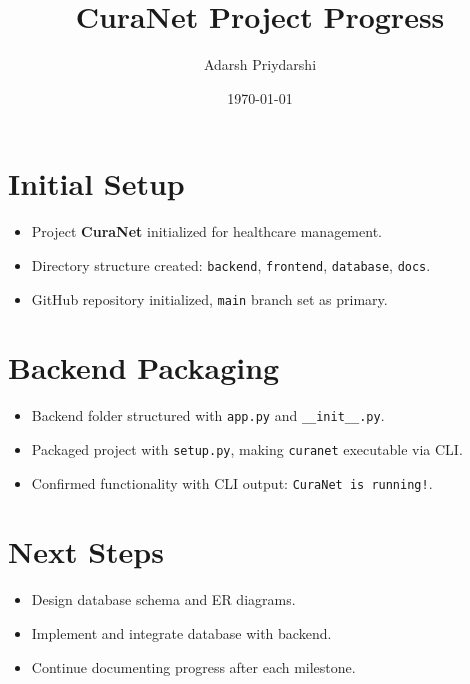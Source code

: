 \documentclass{article}
\title{CuraNet Project Progress}
\author{Adarsh Priydarshi}
\date{\today}
\begin{document}
\maketitle

\section*{Initial Setup}
\begin{itemize}
    \item Project \textbf{CuraNet} initialized for healthcare management.
    \item Directory structure created: \texttt{backend}, \texttt{frontend}, \texttt{database}, \texttt{docs}.
    \item GitHub repository initialized, \texttt{main} branch set as primary.
\end{itemize}

\section*{Backend Packaging}
\begin{itemize}
    \item Backend folder structured with \texttt{app.py} and \texttt{\_\_init\_\_.py}.
    \item Packaged project with \texttt{setup.py}, making \texttt{curanet} executable via CLI.
    \item Confirmed functionality with CLI output: \texttt{CuraNet is running!}.
\end{itemize}

\section*{Next Steps}
\begin{itemize}
    \item Design database schema and ER diagrams.
    \item Implement and integrate database with backend.
    \item Continue documenting progress after each milestone.
\end{itemize}
\end{document}
